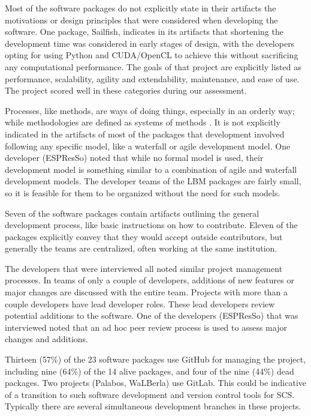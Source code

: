 \documentclass[12pt, notitlepage]{article}
\begin{document}
Most of the software packages do not explicitly state in their artifacts the motivations or design principles that were considered when developing the software. One package, Sailfish, indicates in its artifacts that shortening the development time was considered in early stages of design, with the developers opting for using Python and CUDA/OpenCL to achieve this without sacrificing any computational performance. The goals of that project are explicitly listed as performance, scalability, agility and extendability, maintenance, and ease of use. The project scored well in these categories during our assessment.

Processes, like methods, are ways of doing things, especially in an orderly way; while methodologies are defined as systems of methods \citep{ghezzi1991fundamentals}. It is not explicitly indicated in the artifacts of most of the packages that development involved following any specific model, like a waterfall or agile development model. One developer (ESPResSo) noted that while no formal model is used, their development model is something similar to a combination of agile and waterfall development models. The developer teams of the LBM packages are fairly small, so it is feasible for them to be organized without the need for such models. 

Seven of the software packages contain artifacts outlining the general development process, like basic instructions on how to contribute. Eleven of the packages explicitly convey that they would accept outside contributors, but generally the teams are centralized, often working at the same institution. 

The developers that were interviewed all noted similar project management processes. In teams of only a couple of developers, additions of new features or major changes are discussed with the entire team. Projects with more than a couple developers have lead developer roles. These lead developers review potential additions to the software. One of the developers (ESPResSo) that was interviewed noted that an ad hoc peer review process is used to assess major changes and additions.

Thirteen (57\%) of the 23 software packages use GitHub for managing the project, including nine (64\%) of the 14 alive packages, and four of the nine (44\%) dead packages. Two projects (Palabos, WaLBerla) use GitLab. This could be indicative of a transition to such software development and version control tools for SCS. Typically there are several simultaneous development branches in these projects.
\end{document}
